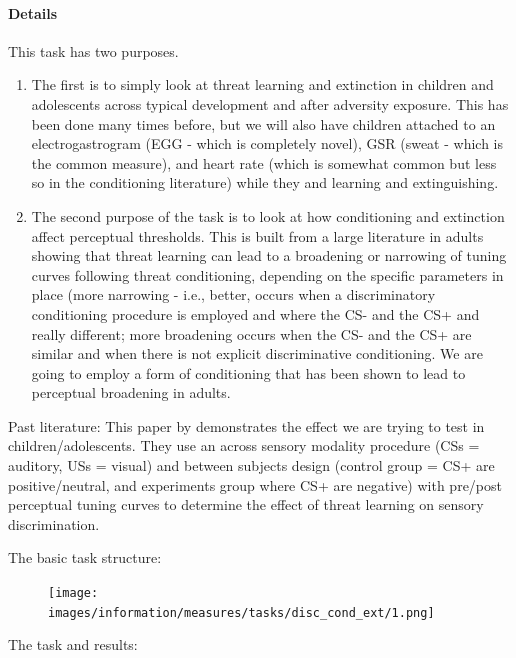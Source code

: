 \documentclass[
]{book}
\providecommand{\tightlist}{%
  \setlength{\itemsep}{0pt}\setlength{\parskip}{0pt}}
\begin{document}
\hypertarget{details-4}{%
\paragraph{Details}\label{details-4}}

This task has two purposes.

\begin{enumerate}
\def\labelenumi{\arabic{enumi}.}
\tightlist
\item
  The first is to simply look at threat learning and extinction in children and adolescents across typical development and after adversity exposure. This has been done many times before, but we will also have children attached to an electrogastrogram (EGG - which is completely novel), GSR (sweat - which is the common measure), and heart rate (which is somewhat common but less so in the conditioning literature) while they and learning and extinguishing.
\item
  The second purpose of the task is to look at how conditioning and extinction affect perceptual thresholds. This is built from a large literature in adults showing that threat learning can lead to a broadening or narrowing of tuning curves following threat conditioning, depending on the specific parameters in place (more narrowing - i.e., better, occurs when a discriminatory conditioning procedure is employed and where the CS- and the CS+ and really different; more broadening occurs when the CS- and the CS+ are similar and when there is not explicit discriminative conditioning. We are going to employ a form of conditioning that has been shown to lead to perceptual broadening in adults.
\end{enumerate}

Past literature:
This paper by \citet{shalev_2018} demonstrates the effect we are trying to test in children/adolescents. They use an across sensory modality procedure (CSs = auditory, USs = visual) and between subjects design (control group = CS+ are positive/neutral, and experiments group where CS+ are negative) with pre/post perceptual tuning curves to determine the effect of threat learning on sensory discrimination.

The basic task structure:

\begin{figure}
\centering
\texttt{[image: images/information/measures/tasks/disc\_cond\_ext/1.png]}
\caption{}
\end{figure}

The task and results:
\end{document}
